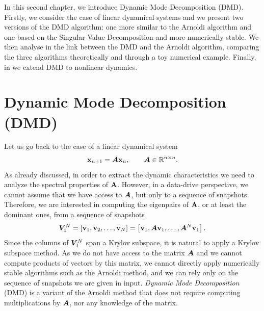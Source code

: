 \label{chapter_dmd}
In this second chapter, we introduce Dynamic Mode Decomposition (DMD). Firstly, we consider the case of linear dynamical systems and we present two versions of the DMD algorithm: one more similar to the Arnoldi algorithm and one based on the Singular Value Decomposition and more numerically stable. We then analyse in  the link between the DMD and the Arnoldi algorithm, comparing the three algorithms theoretically and through a toy numerical example. Finally, in  we extend DMD to nonlinear dynamics.

\section{Dynamic Mode Decomposition (DMD)}
Let us go back to the case of a linear dynamical system
\begin{equation*}
    \vb{x}_{n+1} = \vb*{A}\vb{x}_n, \qquad \vb*{A}\in\mathbb{R}^{n\times n}.
\end{equation*}
As already discussed, in order to extract the dynamic characteristics we need to analyze the spectral properties of $\vb{A}$. However, in a data-drive perspective, we cannot assume that we have access to $\vb*{A}$, but only to a sequence of snapshots. Therefore, we are interested in computing the eigenpairs of $\vb{A}$, or at least the dominant ones, from a sequence of snapshots
\begin{equation*}
    \label{krylov_space}
    \vb*{V}_1^N = \left[\vb{v}_1, \vb{v}_2, \dots, \vb{v}_N\right] = \left[\vb{v}_1, \vb*{A}\vb{v}_1, \dots, \vb*{A}^N\vb{v}_1\right].
\end{equation*}
Since the columns of $\vb*{V}_1^N$ span a Krylov subspace, it is natural to apply a Krylov subspace method. As we do not have access to the matrix $\vb*{A}$ and we cannot compute products of vectors by this matrix, we cannot directly apply numerically stable algorithms such as the Arnoldi method, and we can rely only on the sequence of snapshots we are given in input. \emph{Dynamic Mode Decomposition} (DMD) \cite{schmid_dynamic_2010} is a variant of the Arnoldi method that does not require computing multiplications by $\vb*{A}$, nor any knowledge of the matrix. 

